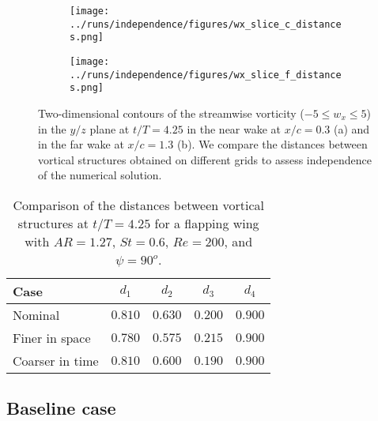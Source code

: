 \begin{figure}
  \centering
  \begin{subfigure}[c]{0.45\textwidth}
    \centering
    \texttt{[image: ../runs/independence/figures/wx\_slice\_c\_distances.png]}
    \caption{}
  \end{subfigure}
  \hfill
  \begin{subfigure}[c]{0.45\textwidth}
    \centering
    \texttt{[image: ../runs/independence/figures/wx\_slice\_f\_distances.png]}
    \caption{}
  \end{subfigure}
  \caption{Two-dimensional contours of the streamwise vorticity ($-5 \leq w_x \leq 5$) in the $y/z$ plane at $t/T = 4.25$ in the near wake at $x / c = 0.3$ (a) and in the far wake at $x / c = 1.3$ (b). We compare the distances between vortical structures obtained on different grids to assess independence of the numerical solution.}
  \label{fig:independence_wx_distances}
\end{figure}

\begin{table}
  \centering
  \begin{tabular}{lcccc}
    \hline\hline
    Case & $d_1$ & $d_2$ & $d_3$ & $d_4$ \\
    \hline
    Nominal & $0.810$ & $0.630$ & $0.200$ & $0.900$ \\
    Finer in space & $0.780$ & $0.575$ & $0.215$ & $0.900$ \\
    Coarser in time & $0.810$ & $0.600$ & $0.190$ & $0.900$ \\
    \hline\hline
  \end{tabular}
  \caption{Comparison of the distances between vortical structures at $t / T = 4.25$ for a flapping wing with $AR = 1.27$, $St = 0.6$, $Re = 200$, and $\psi = 90^o$.}
  \label{tab:independence_wx_distances}
\end{table}

\subsection{Baseline case}

